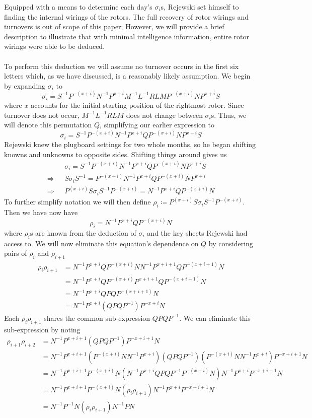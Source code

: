 Equipped with a means to determine each day's $\sigma_i$s, Rejewski set
himself to finding the internal wirings of the rotors. The full
recovery of rotor wirings and turnovers is out of scope of this paper;
However, we will provide a brief description to illustrate that with
minimal intelligence information, entire rotor wirings were able to be deduced.
\\\\To perform this deduction we will assume no turnover occurs in
the first six letters which, as we have discussed, is a reasonably
likely assumption. We begin by expanding $\sigma_i$ to
\[
  \sigma_i = S^{-1}P^{-(x+i)}N^{-1}P^{x+i}M^{-1}L^{-1}RLMP^{-(x+i)}NP^{x+i}S
\]
where $x$ accounts for the initial starting position of the rightmost rotor.
Since turnover does not occur, $M^{-1}L^{-1}RLM$ does not change
between $\sigma_i$s. Thus, we will
denote this permutation $Q$, simplifying our earlier expression to
\[
  \sigma_i = S^{-1}P^{-(x+i)}N^{-1}P^{x+i}QP^{-(x+i)}NP^{x+i}S
\]
Rejewski knew the plugboard settings for two whole months, so he
began shifting knowns and unknowns to opposite sides. Shifting things
around gives us
\begin{align*}
  & \sigma_i = S^{-1}P^{-(x+i)}N^{-1}P^{x+i}QP^{-(x+i)}NP^{x+i}S \\
  \Rightarrow\text{ } & S\sigma_i S^{-1} =
  P^{-(x+i)}N^{-1}P^{x+i}QP^{-(x+i)}NP^{x+i}
  \\
  \Rightarrow\text{ } & P^{(x+i)}S\sigma_i S^{-1}P^{-(x+i)} =
  N^{-1}P^{x+i}QP^{-(x+i)}N
\end{align*}
To further simplify notation we will then define ${\rho_i} \coloneq
P^{(x+i)}S\sigma_i S^{-1}P^{-(x+i)}$. Then we have now have
\[
  \rho_i = N^{-1}P^{x+i}QP^{-(x+i)}N
\]
where $\rho_i$s are known from the deduction of $\sigma_i$ and the
key sheets Rejewski had access to.
We will now eliminate this equation's dependence on $Q$ by considering
pairs of $\rho_i$ and $\rho_{i+1}$
\begin{align*}
  \rho_i\rho_{i+1} & = N^{-1}P^{x+i}QP^{-(x+i)}NN^{-1}P^{x+i+1}QP^{-(x+i+1)}N \\
  & = N^{-1}P^{x+i}QP^{-(x+i)}P^{x+i+1}QP^{-(x+i+1)}N        \\
  & = N^{-1}P^{x+i}QPQP^{-(x+i+1)}N                          \\
  & =N^{-1}P^{x+i}(QPQP^{-1})P^{-{x+i}}N
\end{align*}
Each $\rho_i\rho_{i+1}$ shares the common sub-expression $QPQP^{-1}$.
We can eliminate this sub-expression by noting
\begin{align*}
  \rho_{i+1}\rho_{i+2} & = N^{-1}P^{x+i+1}(QPQP^{-1})P^{-{x+i+1}}N
  \\
  & =
  N^{-1}P^{x+i+1}(P^{-(x+i)}NN^{-1}P^{x+i})(QPQP^{-1})(P^{-(x+i)}NN^{-1}P^{x+i})P^{-{x+i+1}}N
  \\
  & =
  N^{-1}P^{x+i+1}P^{-(x+i)}N(N^{-1}P^{x+i}QPQP^{-1}P^{-(x+i)}N)N^{-1}P^{x+i}P^{-{x+i+1}}N
  \\
  & =
  N^{-1}P^{x+i+1}P^{-(x+i)}N(\rho_i\rho_{i+1})N^{-1}P^{x+i}P^{-{x+i+1}}N
  \\
  & = N^{-1}P^{-1}N(\rho_i\rho_{i+1})N^{-1}PN
  \\
\end{align*}
